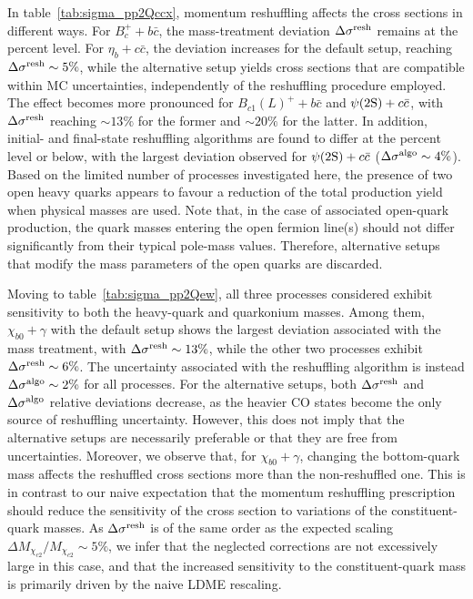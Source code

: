 In table~\ref{tab:sigma_pp2Qccx}, momentum reshuffling affects the cross sections in different ways.
For $B_c^+ + b\bar{c}$, the mass-treatment deviation $\Delta \sigma^{\rm resh}$ remains at the percent level. For $\eta_b + c\bar{c}$, the deviation increases for the default setup, reaching $\Delta \sigma^{\rm resh}\sim5\%$, while the alternative setup yields cross sections that are compatible within MC uncertainties, independently of the reshuffling procedure employed.
The effect becomes more pronounced for $B_{c1}(L)^+ + b \bar{c}$ and $\psi(2\mathrm{S}) + c \bar{c}$, with $\Delta \sigma^{\rm resh}$ reaching ${\sim}13\%$ for the former and ${\sim}20\%$ for the latter.
In addition, initial- and final-state reshuffling algorithms are found to differ at the percent level or below, with the largest deviation observed for $\psi(2\mathrm{S}) + c \bar{c}$ ($\Delta\sigma^{\rm algo}\sim4\%$).
Based on the limited number of processes investigated here, the presence of two open heavy quarks appears to favour a reduction of the total production yield when physical masses are used.
Note that, in the case of associated open-quark production, the quark masses entering the open fermion line(s) should not differ significantly from their typical pole-mass values. Therefore, alternative setups that modify the mass parameters of the open quarks are discarded.

Moving to table~\ref{tab:sigma_pp2Qew}, all three processes considered exhibit sensitivity to both the heavy-quark and quarkonium masses. Among them, $\chi_{b0}+\gamma$ with the default setup shows the largest deviation associated with the mass treatment, with $\Delta \sigma^{\rm resh} \sim 13\%$, while the other two processes exhibit $\Delta \sigma^{\rm resh} \sim 6\%$.
The uncertainty associated with the reshuffling algorithm is instead $\Delta\sigma^{\rm algo} \sim 2\%$ for all processes. For the alternative setups, both $\Delta \sigma^{\rm resh}$ and $\Delta\sigma^{\rm algo}$ relative deviations decrease, as the heavier CO states become the only source of reshuffling uncertainty.
However, this does not imply that the alternative setups are necessarily preferable or that they are free from uncertainties. 
Moreover, we observe that, for $\chi_{b0} + \gamma$, changing the bottom-quark mass affects the reshuffled cross sections more than the non-reshuffled one. 
This is in contrast to our naive expectation that the momentum reshuffling prescription should reduce the sensitivity of the cross section to variations of the constituent-quark masses.  
As $\Delta \sigma^{\rm resh}$ is of the same order as the expected scaling $\Delta M_{\chi_{c2}}/M_{\chi_{c2}} \sim 5\%$, we infer that the neglected corrections are not excessively large in this case, and that the increased sensitivity to the constituent-quark mass is primarily driven by the naive LDME rescaling.

